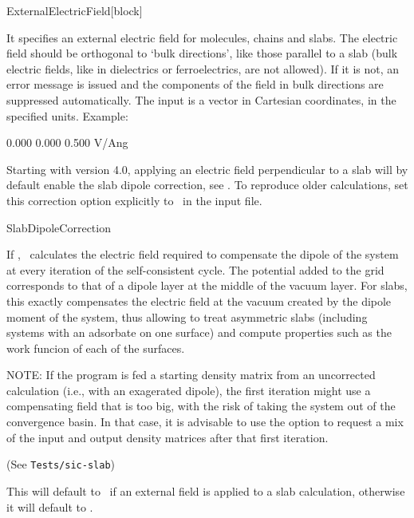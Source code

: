 \begin{fdfentry}{ExternalElectricField}[block]
  
  It specifies an external electric field for molecules, chains and
  slabs.  The electric field should be orthogonal to `bulk
  directions', like those parallel to a slab (bulk electric fields,
  like in dielectrics or ferroelectrics, are not allowed). If it is
  not, an error message is issued and the components of the field in
  bulk directions are suppressed automatically. The input is a vector
  in Cartesian coordinates, in the specified units. Example:
  \begin{fdfexample}
        0.000  0.000  0.500  V/Ang
  \end{fdfexample}

  Starting with version 4.0, applying an electric field perpendicular
  to a slab will by default enable the slab dipole correction, see
  . To reproduce older calculations, set
  this correction option explicitly to \fdffalse\ in the input file.

\end{fdfentry}

\begin{fdflogicalF}{SlabDipoleCorrection}
  
  If \fdftrue, \siesta\ calculates the electric field required to
  compensate the dipole of the system at every iteration of the
  self-consistent cycle. The potential added to the grid corresponds
  to that of a dipole layer at the middle of the vacuum layer. For
  slabs, this exactly compensates the electric field at the vacuum
  created by the dipole moment of the system, thus allowing to treat
  asymmetric slabs (including systems with an adsorbate on one
  surface) and compute properties such as the work funcion of each of
  the surfaces.

  NOTE: If the program is fed a starting density matrix from an
  uncorrected calculation (i.e., with an exagerated dipole), the first
  iteration might use a compensating field that is too big, with the
  risk of taking the system out of the convergence basin. In that
  case, it is advisable to use the
   option to request a mix of the input and
  output density matrices after that first iteration.

  (See \texttt{Tests/sic-slab})

  This will default to \fdftrue\ if an external field is applied to a
  slab calculation, otherwise it will default to \fdffalse.

\end{fdflogicalF}


